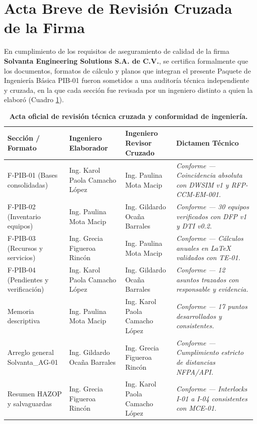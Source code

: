 \documentclass[10pt,letterpaper]{article}
\begin{document}
\newpage
\section{Acta Breve de Revisión Cruzada de la Firma}

En cumplimiento de los requisitos de aseguramiento de calidad de la firma \textbf{Solvanta Engineering Solutions S.A. de C.V.}, se certifica formalmente que los documentos, formatos de cálculo y planos que integran el presente Paquete de Ingeniería Básica PIB-01 fueron sometidos a una auditoría técnica independiente y cruzada, en la que cada sección fue revisada por un ingeniero distinto a quien la elaboró (Cuadro \ref{tab:acta_cruzada}).

\begin{table}[H]
\centering\small
\setlength{\tabcolsep}{6pt}
\renewcommand{\arraystretch}{1.2}
\caption{\textbf{Acta oficial de revisión técnica cruzada y conformidad de ingeniería.}} \label{tab:acta_cruzada}
\begin{tabularx}{\textwidth}{p{3.5cm} p{4.2cm} p{4.2cm} >{\raggedright\arraybackslash}X}
\toprule
\rowcolor{tableheader}
\color{white}\textbf{Sección / Formato} & \color{white}\textbf{Ingeniero Elaborador} & \color{white}\textbf{Ingeniero Revisor Cruzado} & \color{white}\textbf{Dictamen Técnico} \\
\midrule
F-PIB-01 (Bases consolidadas) & Ing. Karol Paola Camacho López & Ing. Paulina Mota Macip & \textit{Conforme --- Coincidencia absoluta con DWSIM v1 y RFP-CCM-EM-001.} \\ \addlinespace[2pt]
F-PIB-02 (Inventario equipos) & Ing. Paulina Mota Macip & Ing. Gildardo Ocaña Barrales & \textit{Conforme --- 30 equipos verificados con DFP v1 y DTI v0.2.} \\ \addlinespace[2pt]
F-PIB-03 (Recursos y servicios) & Ing. Grecia Figueroa Rincón & Ing. Paulina Mota Macip & \textit{Conforme --- Cálculos anuales en LaTeX validados con TE-01.} \\ \addlinespace[2pt]
F-PIB-04 (Pendientes y verificación) & Ing. Karol Paola Camacho López & Ing. Gildardo Ocaña Barrales & \textit{Conforme --- 12 asuntos trazados con responsable y evidencia.} \\ \addlinespace[2pt]
Memoria descriptiva & Ing. Paulina Mota Macip & Ing. Karol Paola Camacho López & \textit{Conforme --- 17 puntos desarrollados y consistentes.} \\ \addlinespace[2pt]
Arreglo general Solvanta\_AG-01 & Ing. Gildardo Ocaña Barrales & Ing. Grecia Figueroa Rincón & \textit{Conforme --- Cumplimiento estricto de distancias NFPA/API.} \\ \addlinespace[2pt]
Resumen HAZOP y salvaguardas & Ing. Grecia Figueroa Rincón & Ing. Karol Paola Camacho López & \textit{Conforme --- Interlocks I-01 a I-04 consistentes con MCE-01.} \\
\bottomrule
\end{tabularx}
\end{table}
\end{document}
